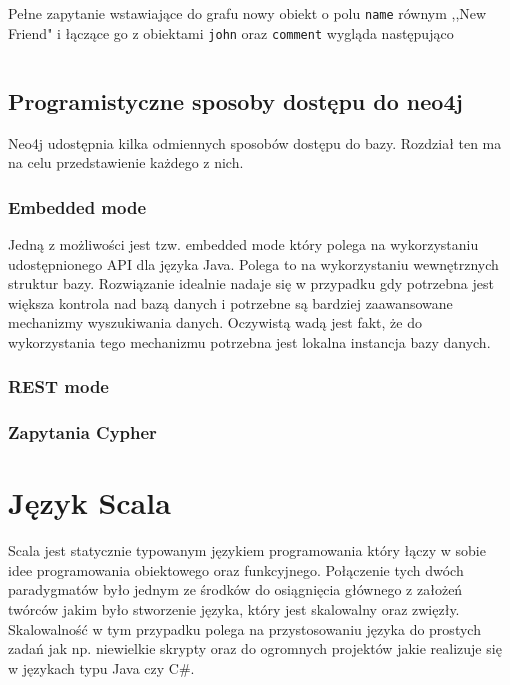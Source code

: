 \documentclass[brudnopis]{xmgr}
\begin{document}
\inputminted{cypher}{listings/cypher/return-section-2.cypher}

Pełne zapytanie wstawiające do grafu nowy obiekt o polu \texttt{name} równym ,,New Friend" i łączące go z obiektami \texttt{john} oraz \texttt{comment} wygląda następująco

\inputminted{cypher}{listings/cypher/sample-create-query.cypher}

\section{Programistyczne sposoby dostępu do neo4j}

Neo4j udostępnia kilka odmiennych sposobów dostępu do bazy. Rozdział ten ma na celu przedstawienie każdego z nich.

\subsection{Embedded mode}

Jedną z możliwości jest tzw. embedded mode który polega na wykorzystaniu udostępnionego API dla języka Java. Polega to na wykorzystaniu wewnętrznych struktur bazy. Rozwiązanie idealnie nadaje się w przypadku gdy potrzebna jest większa kontrola nad bazą danych i potrzebne są bardziej zaawansowane mechanizmy wyszukiwania danych. Oczywistą wadą jest fakt, że do wykorzystania tego mechanizmu potrzebna jest lokalna instancja bazy danych.

\subsection{REST mode}

\subsection{Zapytania Cypher}

\chapter{Język Scala}

Scala jest statycznie typowanym językiem programowania który łączy w sobie idee programowania obiektowego oraz funkcyjnego. Połączenie tych dwóch paradygmatów było jednym ze środków do osiągnięcia głównego z założeń twórców jakim było stworzenie języka, który jest skalowalny oraz zwięzły. Skalowalność w tym przypadku polega na przystosowaniu języka do prostych zadań jak np. niewielkie skrypty oraz do ogromnych projektów jakie realizuje się w językach typu Java czy C\#.
\end{document}
